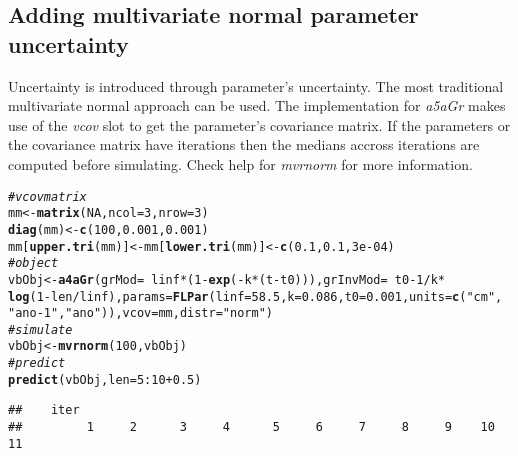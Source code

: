 \documentclass[a4paper,english,10pt]{article}\usepackage[]{graphicx}\usepackage[]{color}
\makeatletter
\newcommand{\hlnum}[1]{\textcolor[rgb]{0.686,0.059,0.569}{#1}}%
\newcommand{\hlstr}[1]{\textcolor[rgb]{0.192,0.494,0.8}{#1}}%
\newcommand{\hlcom}[1]{\textcolor[rgb]{0.678,0.584,0.686}{\textit{#1}}}%
\newcommand{\hlopt}[1]{\textcolor[rgb]{0,0,0}{#1}}%
\newcommand{\hlstd}[1]{\textcolor[rgb]{0.345,0.345,0.345}{#1}}%
\newcommand{\hlkwb}[1]{\textcolor[rgb]{0.69,0.353,0.396}{#1}}%
\newcommand{\hlkwc}[1]{\textcolor[rgb]{0.333,0.667,0.333}{#1}}%
\newcommand{\hlkwd}[1]{\textcolor[rgb]{0.737,0.353,0.396}{\textbf{#1}}}%
\newenvironment{kframe}{%
 \def\at@end@of@kframe{}%
 \ifinner\ifhmode%
  \def\at@end@of@kframe{\end{minipage}}%
  \begin{minipage}{\columnwidth}%
 \fi\fi%
 \def\FrameCommand##1{\hskip\@totalleftmargin \hskip-\fboxsep
 \colorbox{shadecolor}{##1}\hskip-\fboxsep
     \hskip-\linewidth \hskip-\@totalleftmargin \hskip\columnwidth}%
 \MakeFramed {\advance\hsize-\width
   \@totalleftmargin\z@ \linewidth\hsize
   \@setminipage}}%
 {\par\unskip\endMakeFramed%
 \at@end@of@kframe}
\newenvironment{knitrout}{}{} %
\makeatother
\begin{document}
\subsection{Adding multivariate normal parameter uncertainty}

Uncertainty is introduced through parameter's uncertainty. The most traditional multivariate normal approach can be used. The implementation for \emph{a5aGr} makes use of the \emph{vcov} slot to get the parameter's covariance matrix. If the parameters or the covariance matrix have iterations then the medians accross iterations are computed before simulating. Check help for \emph{mvrnorm} for more information.

\begin{knitrout}
\color{fgcolor}\begin{kframe}
\begin{alltt}
\hlcom{# vcov matrix}
\hlstd{mm} \hlkwb{<-} \hlkwd{matrix}\hlstd{(}\hlnum{NA}\hlstd{,} \hlkwc{ncol} \hlstd{=} \hlnum{3}\hlstd{,} \hlkwc{nrow} \hlstd{=} \hlnum{3}\hlstd{)}
\hlkwd{diag}\hlstd{(mm)} \hlkwb{<-} \hlkwd{c}\hlstd{(}\hlnum{100}\hlstd{,} \hlnum{0.001}\hlstd{,} \hlnum{0.001}\hlstd{)}
\hlstd{mm[}\hlkwd{upper.tri}\hlstd{(mm)]} \hlkwb{<-} \hlstd{mm[}\hlkwd{lower.tri}\hlstd{(mm)]} \hlkwb{<-} \hlkwd{c}\hlstd{(}\hlnum{0.1}\hlstd{,} \hlnum{0.1}\hlstd{,} \hlnum{3e-04}\hlstd{)}
\hlcom{# object}
\hlstd{vbObj} \hlkwb{<-} \hlkwd{a4aGr}\hlstd{(}\hlkwc{grMod} \hlstd{=} \hlopt{~}\hlstd{linf} \hlopt{*} \hlstd{(}\hlnum{1} \hlopt{-} \hlkwd{exp}\hlstd{(}\hlopt{-}\hlstd{k} \hlopt{*} \hlstd{(t} \hlopt{-} \hlstd{t0))),} \hlkwc{grInvMod} \hlstd{=} \hlopt{~}\hlstd{t0} \hlopt{-} \hlnum{1}\hlopt{/}\hlstd{k} \hlopt{*}
    \hlkwd{log}\hlstd{(}\hlnum{1} \hlopt{-} \hlstd{len}\hlopt{/}\hlstd{linf),} \hlkwc{params} \hlstd{=} \hlkwd{FLPar}\hlstd{(}\hlkwc{linf} \hlstd{=} \hlnum{58.5}\hlstd{,} \hlkwc{k} \hlstd{=} \hlnum{0.086}\hlstd{,} \hlkwc{t0} \hlstd{=} \hlnum{0.001}\hlstd{,} \hlkwc{units} \hlstd{=} \hlkwd{c}\hlstd{(}\hlstr{"cm"}\hlstd{,}
    \hlstr{"ano-1"}\hlstd{,} \hlstr{"ano"}\hlstd{)),} \hlkwc{vcov} \hlstd{= mm,} \hlkwc{distr} \hlstd{=} \hlstr{"norm"}\hlstd{)}
\hlcom{# simulate}
\hlstd{vbObj} \hlkwb{<-} \hlkwd{mvrnorm}\hlstd{(}\hlnum{100}\hlstd{, vbObj)}
\hlcom{# predict}
\hlkwd{predict}\hlstd{(vbObj,} \hlkwc{len} \hlstd{=} \hlnum{5}\hlopt{:}\hlnum{10} \hlopt{+} \hlnum{0.5}\hlstd{)}
\end{alltt}
\begin{verbatim}
##    iter
##         1     2      3     4      5     6     7     8     9    10    11

\end{verbatim}
\end{kframe}
\end{knitrout}
\end{document}
